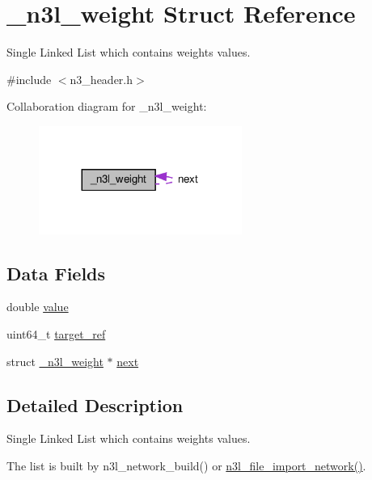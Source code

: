 \hypertarget{struct__n3l__weight}{}\section{\+\_\+n3l\+\_\+weight Struct Reference}
\label{struct__n3l__weight}


Single Linked List which contains weight\textquotesingle{}s values.  




{\ttfamily \#include $<$n3\+\_\+header.\+h$>$}



Collaboration diagram for \+\_\+n3l\+\_\+weight\+:\nopagebreak
\begin{figure}[H]
\begin{center}
\leavevmode
\includegraphics[width=188pt]{struct__n3l__weight__coll__graph}
\end{center}
\end{figure}
\subsection*{Data Fields}
\begin{DoxyCompactItemize}
\item 
double \hyperlink{struct__n3l__weight_a1d1ebc5e04ba1dd26094993dd94aa710}{value}
\item 
uint64\+\_\+t \hyperlink{struct__n3l__weight_ac5094b52f09a092ffb1cdc4cc594f38f}{target\+\_\+ref}
\item 
struct \hyperlink{struct__n3l__weight}{\+\_\+n3l\+\_\+weight} $\ast$ \hyperlink{struct__n3l__weight_adf96faae4820538377678c82ec96d48e}{next}
\end{DoxyCompactItemize}


\subsection{Detailed Description}
Single Linked List which contains weight\textquotesingle{}s values. 

The list is built by n3l\+\_\+network\+\_\+build() or \hyperlink{n3__file_8c_a4fef76548ed87845dceafaa9527a83d0}{n3l\+\_\+file\+\_\+import\+\_\+network()}.

